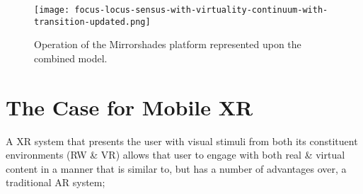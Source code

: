 




\begin{figure}[h]
	\begin{center}
		\texttt{[image: focus-locus-sensus-with-virtuality-continuum-with-transition-updated.png]}
		\caption{Operation of the Mirrorshades platform represented upon the combined model.}
		\label{focus-locus-sensus-with-virtuality-continuum-with-transition}
	\end{center}	
\end{figure}


\section{The Case for Mobile XR}


A XR system that presents the user with visual stimuli from both its constituent environments (RW \& VR) allows that user to engage with both real \& virtual content in a manner that is similar to, but has a number of advantages over, a traditional AR system;

